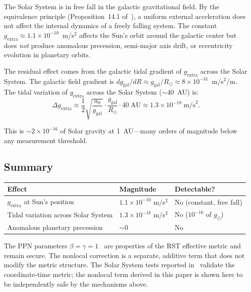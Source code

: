 \documentclass[11pt,a4paper]{article}
\begin{document}
The Solar System is in free fall in the galactic gravitational field.
By the equivalence principle (Proposition~14.1 of~\cite{Wells2026c}), a uniform external acceleration does not affect the internal dynamics of a freely falling system.
The constant $g_{\mathrm{extra}} \approx 1.1 \times 10^{-10}$~m/s$^2$ affects the Sun's orbit around the galactic center but does \textit{not} produce anomalous precession, semi-major axis drift, or eccentricity evolution in planetary orbits.

The residual effect comes from the galactic tidal gradient of $g_{\mathrm{extra}}$ across the Solar System.
The galactic field gradient is $dg_{\mathrm{gal}}/dR \approx g_{\mathrm{gal}}/R_\odot \approx 8 \times 10^{-31}$~m/s$^2$/m.
The tidal variation of $g_{\mathrm{extra}}$ across the Solar System ($\sim\!40$~AU) is:
\begin{equation}
\Delta g_{\mathrm{extra}} \approx \frac{1}{2}\sqrt{\frac{a_0}{g_{\mathrm{gal}}}} \cdot \frac{g_{\mathrm{gal}}}{R_\odot} \cdot 40\;\mathrm{AU} \approx 1.3 \times 10^{-18} \;\text{m/s}^2.
\end{equation}

This is $\sim\!2 \times 10^{-16}$ of Solar gravity at 1~AU---many orders of magnitude below any measurement threshold.

\subsection{Summary}

\begin{center}
\begin{tabular}{lll}
\toprule
\textbf{Effect} & \textbf{Magnitude} & \textbf{Detectable?} \\
\midrule
$g_{\mathrm{extra}}$ at Sun's position & $1.1 \times 10^{-10}$ m/s$^2$ & No (constant, free fall) \\
Tidal variation across Solar System & $1.3 \times 10^{-18}$ m/s$^2$ & No ($10^{-16}$ of $g_\odot$) \\
Anomalous planetary precession & $\sim\!0$ & No \\
\bottomrule
\end{tabular}
\end{center}

The PPN parameters $\beta = \gamma = 1$~\cite{Wells2026c} are properties of the RST effective metric and remain secure.
The nonlocal correction is a separate, additive term that does not modify the metric structure.
The Solar System tests reported in~\cite{Wells2026c} validate the coordinate-time metric; the nonlocal term derived in this paper is shown here to be independently safe by the mechanisms above.
\end{document}

